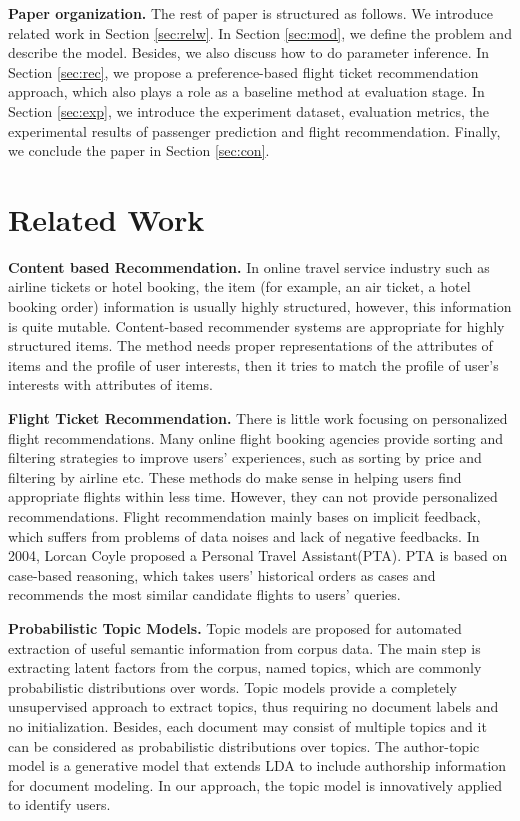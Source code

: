 \documentclass{llncs}
\begin{document}
\textbf{Paper organization.} The rest of paper is structured as follows. We introduce related work in Section \ref{sec:relw}. In Section \ref{sec:mod}, we define the problem and describe the model. Besides, we also discuss how to do parameter inference. In Section \ref{sec:rec}, we propose a preference-based flight ticket recommendation approach, which also plays a role as a baseline method at evaluation stage. In Section \ref{sec:exp}, we introduce the experiment dataset, evaluation metrics, the experimental results of passenger prediction and flight recommendation. Finally, we conclude the paper in Section \ref{sec:con}.

\section{Related Work}\par
\label{sec:relw}
\textbf{Content based Recommendation.} In online travel service industry such as airline tickets or hotel booking, the item (for example, an air ticket, a hotel booking order) information is usually highly structured, however, this information is quite mutable. Content-based recommender systems \cite{tech:cset}\cite{lops:handbook}are appropriate for highly structured items. The method needs proper representations of the attributes of items and the profile of user interests, then it tries to match the profile of user's interests with attributes of items.\par
\textbf{Flight Ticket Recommendation.} There is little work focusing on personalized flight  recommendations. Many online flight booking agencies provide sorting and filtering strategies to improve users' experiences, such as sorting by price and filtering by airline etc. These methods do make sense in helping users find appropriate flights within less time. However, they can not provide personalized recommendations. Flight recommendation mainly bases on implicit feedback\cite{song:mining}, which suffers from problems of data noises and lack of negative feedbacks. In 2004, Lorcan Coyle\cite{lor:flight} proposed a Personal Travel Assistant(PTA). PTA is based on case-based reasoning, which takes users' historical orders as cases and recommends the most similar candidate flights to users' queries.\par

\textbf{Probabilistic Topic Models.}  Topic models\cite{blei:lda}\cite{mic:atm}\cite{mark:prob} are proposed for automated extraction of useful semantic information from corpus data. The main step is extracting latent factors from the corpus, named topics, which are commonly probabilistic distributions over words. Topic models provide a completely unsupervised approach to extract topics, thus requiring no document labels and no initialization. Besides, each document may consist of multiple topics and it can be considered as probabilistic distributions over topics. The author-topic model is a generative model that extends LDA to include authorship information for document modeling. In our approach, the topic model is innovatively applied to identify users. \par
\end{document}
